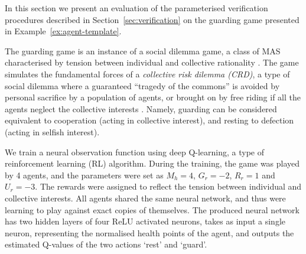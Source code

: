 
In this section we present an evaluation of the parameterised verification
procedures described in Section~\ref{sec:verification} on the guarding game
presented in Example~\ref{ex:agent-template}.


The guarding game is an instance of a social dilemma game, a class of
MAS characterised by tension between individual
and collective rationality \cite{VanlangeJPV13}. The  game simulates
the fundamental forces of a \emph{collective risk dilemma (CRD)}, a type of
social dilemma where a guaranteed ``tragedy of the commons''
\cite{Hardin68} is avoided by personal sacrifice by a population of
agents, or brought on by free riding if all the agents %
neglect the collective interests %
\cite{SantosP11}.
%
Namely, guarding can be considered equivalent to cooperation (acting in
collective interest), and resting to defection (acting in selfish
interest).


We train a neural observation function using deep Q-learning, a type of
reinforcement learning (RL) algorithm. During the training, the game was played
by 4 agents, and the parameters were set as $M_h = 4$, $G_r = -2$, $R_r = 1$
and $U_r = -3$. The rewards were assigned to reflect the tension between
individual and collective interests. All agents shared the same neural network,
and thus
were learning to play against exact copies of themselves.
%
%
The produced neural network has two hidden layers of four ReLU activated
neurons, takes as input a single neuron, representing the normalised health
points of the agent, and outputs the estimated Q-values of the two actions
`rest' and `guard'.


